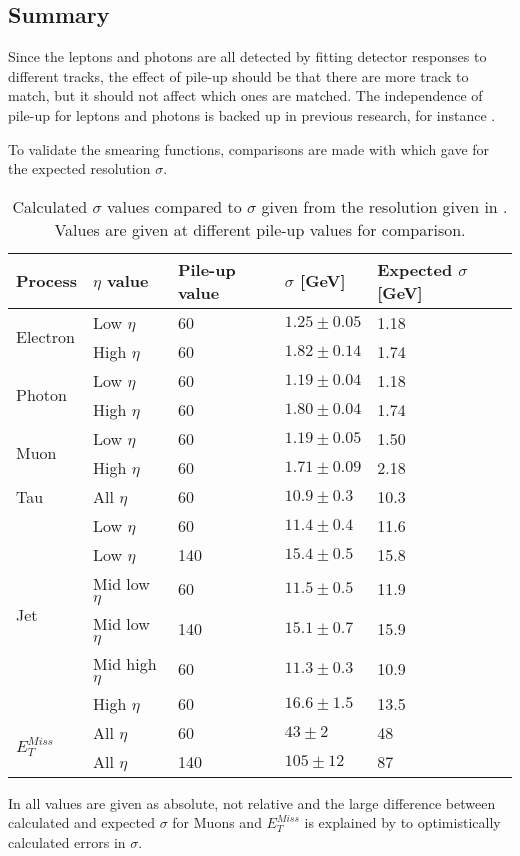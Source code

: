\subsection{Summary}\label{sec:res:subsec:sum}
Since the leptons and photons are all detected by fitting detector responses to different tracks, the effect of pile-up should be that there are more track to match, but it should not affect which ones are matched. The independence of pile-up for leptons and photons is backed up in previous research, for instance \citep{Electronperf:2011, ATLAS:LOI2}.

To validate the smearing functions, comparisons are made with \citep{ATL-PHYS-PUB-2013-004} which gave  for the expected resolution $\sigma$.
\renewcommand{\arraystretch}{1.5} %
\begin{table}[H]
\begin{center}
\begin{tabular}{|l|l|l|l|l|}
\hline
Process& $\eta$ value & Pile-up value &$\sigma$ [GeV]& Expected $\sigma$ [GeV]\\ \hline
\multirow{2}{*}{Electron}& Low $\eta$&60&$1.25 \pm 0.05$&1.18\\
&High $\eta$&60&$1.82 \pm 0.14$&1.74\\ \hline
\multirow{2}{*}{Photon} & Low $\eta$&60&$1.19 \pm 0.04$&1.18\\
&High $\eta$&60&$1.80 \pm 0.04$&1.74\\ \hline
\multirow{2}{*}{Muon} & Low $\eta$&60&$1.19 \pm 0.05$&1.50\\
&High $\eta$&60&$1.71 \pm 0.09$&2.18\\ \hline
Tau& All $\eta$&60&$10.9 \pm 0.3$&10.3\\ \hline
\multirow{6}{*}{Jet} &Low $\eta$&60&$11.4 \pm 0.4$&11.6\\
&Low $\eta$&140&$15.4 \pm 0.5$&15.8\\
&Mid low $\eta$&60&$11.5 \pm 0.5$&11.9\\
&Mid low $\eta$&140&$15.1 \pm 0.7$&15.9\\
&Mid high $\eta$&60&$11.3 \pm 0.3$&10.9\\
&High $\eta$&60&$16.6 \pm 1.5$&13.5\\ \hline
\multirow{2}{*}{$E_T^{Miss}$}&All $\eta$&60&$43 \pm 2$&48\\ 
&All $\eta$&140&$105 \pm 12$&87\\  \hline
\end{tabular}
\end{center}
\caption{Calculated $\sigma$ values compared to $\sigma$ given from the resolution given in . Values are given at different pile-up values for comparison.}
\label{tab:sigmaval}
\end{table}
\renewcommand{\arraystretch}{1.0} %
In  all values are given as absolute, not relative and the large difference between calculated and expected $\sigma$ for Muons and $E_T^{Miss}$ is explained by to optimistically calculated errors in $\sigma$.

